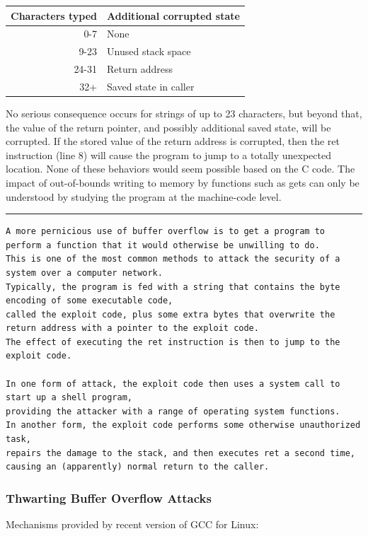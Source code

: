 \documentclass[11pt]{article}
\begin{document}
\begin{center}
\begin{tabular}{rl}
Characters typed & Additional corrupted state\\
\hline
0-7 & None\\
9-23 & Unused stack space\\
24-31 & Return address\\
32+ & Saved state in caller\\
\end{tabular}
\end{center}

No serious consequence occurs for strings of up to 23 characters, but beyond that, the value of the return pointer, and possibly additional saved state, will be corrupted. If the stored value of the return address is corrupted, then the ret instruction (line 8) will cause the program to jump to a totally unexpected location. None of these behaviors would seem possible based on the C code. The impact of out-of-bounds writing to memory by functions such as gets can only be understood by studying the program at the machine-code level.\\

\noindent\rule{\textwidth}{0.5pt}

\begin{verbatim}
A more pernicious use of buffer overflow is to get a program to perform a function that it would otherwise be unwilling to do. 
This is one of the most common methods to attack the security of a system over a computer network. 
Typically, the program is fed with a string that contains the byte encoding of some executable code, 
called the exploit code, plus some extra bytes that overwrite the return address with a pointer to the exploit code. 
The effect of executing the ret instruction is then to jump to the exploit code.

In one form of attack, the exploit code then uses a system call to start up a shell program, 
providing the attacker with a range of operating system functions. 
In another form, the exploit code performs some otherwise unauthorized task, 
repairs the damage to the stack, and then executes ret a second time, 
causing an (apparently) normal return to the caller.
\end{verbatim}

\subsubsection{Thwarting Buffer Overflow Attacks}
\label{sec:orga1a31da}
Mechanisms provided by recent version of GCC for Linux:\\
\end{document}
